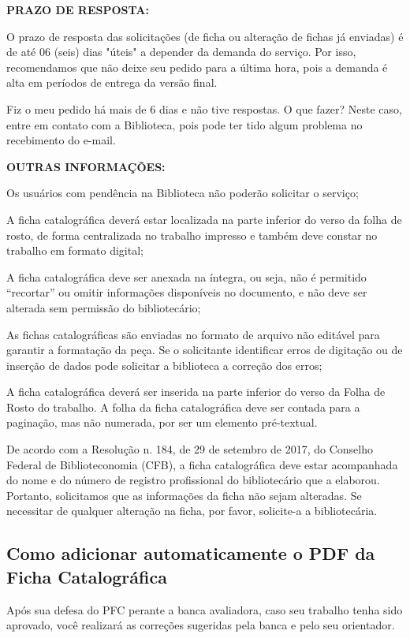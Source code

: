 {\bf PRAZO DE RESPOSTA:}

O prazo de resposta das solicitações (de ficha ou alteração de fichas já enviadas) é de até 06 (seis) dias "úteis" a depender da demanda do serviço. Por isso, recomendamos que não deixe seu pedido para a última hora, pois a demanda é alta em períodos de entrega da versão final.

Fiz o meu pedido há mais de 6 dias e não tive respostas. O que fazer? Neste caso, entre em contato com a Biblioteca, pois pode ter tido algum problema no recebimento do e-mail.

{\bf OUTRAS INFORMAÇÕES:}

Os usuários com pendência na Biblioteca não poderão solicitar o serviço;

A ficha catalográfica deverá estar localizada na parte inferior do verso da folha de rosto, de forma centralizada no trabalho impresso e também deve constar no trabalho em formato digital;

A ficha catalográfica deve ser anexada na íntegra, ou seja, não é permitido ``recortar'' ou omitir informações disponíveis no documento, e não deve ser alterada sem permissão do bibliotecário;

As fichas catalográficas são enviadas no formato de arquivo não editável para garantir a formatação da peça. Se o solicitante identificar erros de digitação ou de inserção de
dados pode solicitar a biblioteca a correção dos erros;

A ficha catalográfica deverá ser inserida na parte inferior do verso da Folha de Rosto do trabalho. A folha da ficha catalográfica deve ser contada para a paginação, mas não numerada, por ser um elemento pré-textual.

De acordo com a Resolução n. 184, de 29 de setembro de 2017, do Conselho
Federal de Biblioteconomia (CFB), a ficha catalográfica deve estar acompanhada do
nome e do número de registro profissional do bibliotecário que a elaborou. Portanto,
solicitamos que as informações da ficha não sejam alteradas. Se necessitar de qualquer alteração na ficha, por favor, solicite-a a bibliotecária.


\subsection{Como adicionar automaticamente o PDF da Ficha Catalográfica}

Após sua defesa do PFC perante a banca avaliadora, caso seu trabalho tenha sido aprovado, você realizará as correções sugeridas pela banca e pelo seu orientador.


